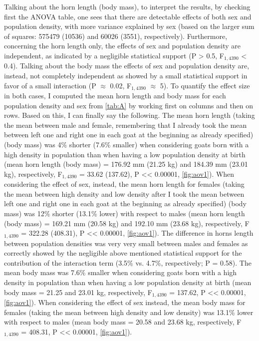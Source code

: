 \documentclass{article}
\begin{document}
Talking about the horn length (body mass), to interpret the results, by checking first the ANOVA table, one sees that there are detectable effects of both sex and population density, with more variance explained by sex (based on the larger sum of squares: 575479 (10536) and 60026 (3551), respectively).
Furthermore, concerning the horn length only, the effects of sex and population density are independent, as indicated by a negligible statistical support (P > 0.5, F$_{1,4390}$ < 0.4).
Talking about the body mass the effects of sex and population density are, instead, not completely independent as showed by a small statistical support in favor of a small interaction (P $\approx$ 0.02, F$_{1,4390}$ $\approx$ 5).
To quantify the effect size in both cases, I computed the mean horn length and body mass for each population density and sex from \autoref{tab:A} by working first on columns and then on rows. Based on this, I can finally say the following.
The mean horn length (taking the mean between male and female, remembering that I already took the mean between left one and right one in each goat at the beginning as already specified) (body mass) was 4\% shorter (7.6\% smaller) when considering goats born with a high density in population than when having a low population density at birth (mean horn length (body mass) = 176.92 mm (21.25 kg) and 184.39 mm (23.01 kg), respectively, F$_{1,4390}$ = 33.62 (137.62), P << 0.00001, \autoref{fig:aov1}).
When considering the effect of sex, instead, the mean horn length for females (taking the mean between high density and low density after I took the mean between left one and right one in each goat at the beginning as already specified) (body mass) was 12\% shorter (13.1\% lower) with respect to males (mean horn length (body mass) = 169.21 mm (20.58 kg) and 192.10 mm (23.68 kg), respectively, F$_{1,4390}$ = 322.28 (408.31), P << 0.00001, \autoref{fig:aov1}).
The difference in horns length between population densities was very very small between males and females as correctly showed by the negligible above mentioned statistical support for the contribution of the interaction term (3.5\% vs. 4.7\%, respectively; P = 0.58). 
\iffalse
The mean body mass was 7.6\% smaller when considering goats born with a high density in population than when having a low population density at birth (mean body mass = 21.25 and 23.01 kg, respectively, F$_{1,4390}$ = 137.62, P << 0.00001, \autoref{fig:aov1}).
When considering the effect of sex instead, the mean body mass for females (taking the mean between high density and low density) was 13.1\% lower with respect to males (mean body mass = 20.58 and 23.68 kg, respectively, F$_{1,4390}$ = 408.31, P << 0.00001, \autoref{fig:aov1}).
\end{document}
